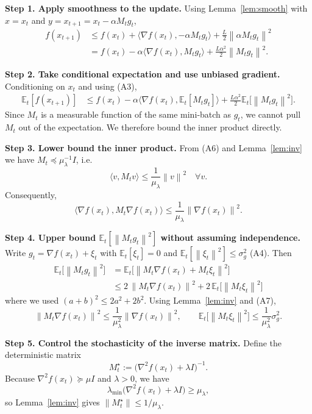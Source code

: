 \documentclass{article}
\newcommand{\E}{\mathbb{E}}
\newcommand{\norm}[1]{\left\|#1\right\|}
\newcommand{\inner}[2]{\langle #1,#2\rangle}
\begin{document}
\noindent\textbf{Step 1. Apply smoothness to the update.}  
Using Lemma~\ref{lem:smooth} with $x=x_{t}$ and $y=x_{t+1}=x_{t}-\alpha M_{t}g_{t}$,
\[
\begin{aligned}
f(x_{t+1})
&\le f(x_{t})+\inner{\nabla f(x_{t})}{-\alpha M_{t}g_{t}}
   +\frac{L}{2}\norm{\alpha M_{t}g_{t}}^{2} \tag{3}\\
&= f(x_{t})-\alpha\inner{\nabla f(x_{t})}{M_{t}g_{t}}
   +\frac{L\alpha^{2}}{2}\norm{M_{t}g_{t}}^{2}.
\end{aligned}
\]

\noindent\textbf{Step 2. Take conditional expectation and use unbiased gradient.}  
Conditioning on $x_{t}$ and using (A3),
\[
\begin{aligned}
\E_{t}[f(x_{t+1})]
&\le f(x_{t})-\alpha\inner{\nabla f(x_{t})}{\E_{t}[M_{t}g_{t}]}
   +\frac{L\alpha^{2}}{2}\E_{t}\!\big[\norm{M_{t}g_{t}}^{2}\big]. \tag{4}
\end{aligned}
\]
Since $M_{t}$ is a measurable function of the same mini‑batch as $g_{t}$, we cannot pull $M_{t}$ out of the expectation.  
We therefore bound the inner product directly.

\noindent\textbf{Step 3. Lower bound the inner product.}  
From (A6) and Lemma~\ref{lem:inv} we have $M_{t}\preceq \mu_{\lambda}^{-1}I$, i.e.
\[
\inner{v}{M_{t}v}\le \frac{1}{\mu_{\lambda}}\norm{v}^{2}\quad\forall v.
\]
Consequently,
\[
\inner{\nabla f(x_{t})}{M_{t}\nabla f(x_{t})}
\le \frac{1}{\mu_{\lambda}}\norm{\nabla f(x_{t})}^{2}. \tag{5}
\]

\noindent\textbf{Step 4. Upper bound $\E_{t}[\norm{M_{t}g_{t}}^{2}]$ without assuming independence.}  
Write $g_{t}= \nabla f(x_{t})+\xi_{t}$ with $\E_{t}[\xi_{t}]=0$ and $\E_{t}[\norm{\xi_{t}}^{2}]\le\sigma_{g}^{2}$ (A4). Then
\[
\begin{aligned}
\E_{t}\!\big[\norm{M_{t}g_{t}}^{2}\big]
&=\E_{t}\!\big[\norm{M_{t}\nabla f(x_{t})+M_{t}\xi_{t}}^{2}\big] \\
&\le 2\,\norm{M_{t}\nabla f(x_{t})}^{2}
   +2\,\E_{t}\!\big[\norm{M_{t}\xi_{t}}^{2}\big] \tag{6}
\end{aligned}
\]
where we used $(a+b)^{2}\le 2a^{2}+2b^{2}$.  
Using Lemma~\ref{lem:inv} and (A7),
\[
\norm{M_{t}\nabla f(x_{t})}^{2}\le\frac{1}{\mu_{\lambda}^{2}}\norm{\nabla f(x_{t})}^{2},
\qquad
\E_{t}\!\big[\norm{M_{t}\xi_{t}}^{2}\big]\le\frac{1}{\mu_{\lambda}^{2}}\sigma_{g}^{2}. \tag{7}
\]

\noindent\textbf{Step 5. Control the stochasticity of the inverse matrix.}  
Define the deterministic matrix
\[
M^{\star}_{t}:=\bigl(\nabla^{2}f(x_{t})+\lambda I\bigr)^{-1}.
\]
Because $\nabla^{2}f(x_{t})\succeq \mu I$ and $\lambda>0$, we have
\[
\lambda_{\min}\!\bigl(\nabla^{2}f(x_{t})+\lambda I\bigr)\ge \mu_{\lambda},
\]
so Lemma~\ref{lem:inv} gives $\|M^{\star}_{t}\|\le 1/\mu_{\lambda}$.
\end{document}
